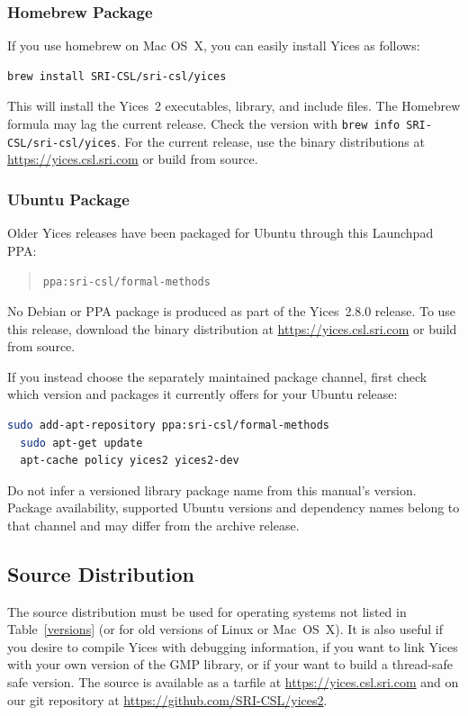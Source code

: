 \documentclass[11pt,twoside,fleqn,openright,titlepage]{cslreport}
\begin{document}
\subsubsection{Homebrew Package}

If you use homebrew on Mac OS~X, you can easily install Yices as follows:
\begin{small}
\begin{lstlisting}[language=sh]
   brew install SRI-CSL/sri-csl/yices
\end{lstlisting}
\end{small}
This will install the Yices~2 executables, library, and include files.
The Homebrew formula may lag the current release. Check the version with
\texttt{brew info SRI-CSL/sri-csl/yices}. For the current release, use
the binary distributions at \url{https://yices.csl.sri.com} or build
from source.


\subsubsection{Ubuntu Package}

Older Yices releases have been packaged for Ubuntu through this Launchpad PPA:
\begin{quote}
\texttt{ppa:sri-csl/formal-methods}
\end{quote}
No Debian or PPA package is produced as
part of the Yices~2.8.0 release. To use this release, download the binary
distribution at \url{https://yices.csl.sri.com} or build from source.

If you instead choose the separately maintained package channel, first check
which version and packages it currently offers for your Ubuntu release:
\begin{small}
\begin{lstlisting}[language=sh]
  sudo add-apt-repository ppa:sri-csl/formal-methods
  sudo apt-get update
  apt-cache policy yices2 yices2-dev
\end{lstlisting}
\end{small}
Do not infer a versioned library package name from this manual's version.
Package availability, supported Ubuntu versions and dependency names belong
to that channel and may differ from the archive release.


\subsection{Source Distribution}

The source distribution must be used for operating systems not listed
in Table~\ref{versions} (or for old versions of Linux or Mac~OS~X). It
is also useful if you desire to compile Yices with debugging
information, if you want to link Yices with your own version of the
GMP library, or if your want to build a thread-safe safe version.
The source is available as a tarfile at
\url{https://yices.csl.sri.com} and on our git repository at
\url{https://github.com/SRI-CSL/yices2}.
\end{document}
